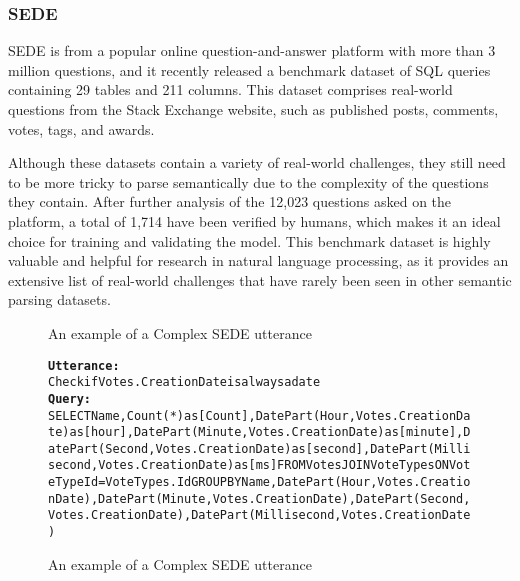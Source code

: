 \subsubsection{SEDE}

\ac{SEDE} \cite{DBLP:journals/corr/abs-2106-05006} is from a popular online question-and-answer platform with more than 3 million questions, and it recently released a benchmark dataset of SQL queries containing 29 tables and 211 columns. This dataset comprises real-world questions from the Stack Exchange website, such as published posts, comments, votes, tags, and awards.

Although these datasets contain a variety of real-world challenges, they still need to be more tricky to parse semantically due to the complexity of the questions they contain. After further analysis of the 12,023 questions asked on the platform, a total of 1,714 have been verified by humans, which makes it an ideal choice for training and validating the model. This benchmark dataset is highly valuable and helpful for research in natural language processing, as it provides an extensive list of real-world challenges that have rarely been seen in other semantic parsing datasets.

\begin{figure}[H]
    \label{fig:sede_sql}
    \begin{AIbox}{An example of a Complex SEDE utterance}
        \vspace{-5px}
        \parbox{1\textwidth}{\scriptsize
        \begin{alltt} 
            {\bf Utterance:} \\ 
            Check if Votes.CreationDate is always a date
            \\
            {\bf Query:} \\
            SELECT Name, Count(*)as [Count], DatePart(Hour, Votes.CreationDate)as [hour],DatePart(Minute, Votes.CreationDate)as [minute],DatePart(Second, Votes.CreationDate)as [second],DatePart(Millisecond, Votes.CreationDate)as [ms] FROM Votes JOIN VoteTypes ON VoteTypeId = VoteTypes.Id GROUP BY Name, DatePart(Hour, Votes.CreationDate),DatePart(Minute, Votes.CreationDate),DatePart(Second, Votes.CreationDate),DatePart(Millisecond, Votes.CreationDate)
        \end{alltt}
        }
        \vspace{-5px}
    \end{AIbox}
    
    \caption{An example of a Complex SEDE utterance}
\end{figure}